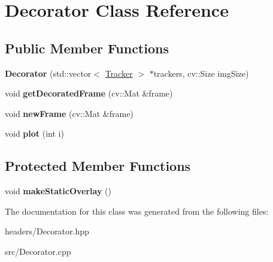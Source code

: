 \hypertarget{classDecorator}{\section{Decorator Class Reference}
\label{classDecorator}
}
\subsection*{Public Member Functions}
\begin{DoxyCompactItemize}
\item 
\hypertarget{classDecorator_a2c55e2aed9fe25a5be7fe5f2a8705d66}{{\bfseries Decorator} (std\-::vector$<$ \hyperlink{classTracker}{Tracker} $>$ $\ast$trackers, cv\-::\-Size img\-Size)}\label{classDecorator_a2c55e2aed9fe25a5be7fe5f2a8705d66}

\item 
\hypertarget{classDecorator_a4da99b258d95fe21772d534e915a4765}{void {\bfseries get\-Decorated\-Frame} (cv\-::\-Mat \&frame)}\label{classDecorator_a4da99b258d95fe21772d534e915a4765}

\item 
\hypertarget{classDecorator_a162529f4b2bd01f0023910b839f80b6e}{void {\bfseries new\-Frame} (cv\-::\-Mat \&frame)}\label{classDecorator_a162529f4b2bd01f0023910b839f80b6e}

\item 
\hypertarget{classDecorator_a2184982851eaca7055c9bf46d5c5a7c5}{void {\bfseries plot} (int i)}\label{classDecorator_a2184982851eaca7055c9bf46d5c5a7c5}

\end{DoxyCompactItemize}
\subsection*{Protected Member Functions}
\begin{DoxyCompactItemize}
\item 
\hypertarget{classDecorator_a5219da97e4c259f8fa36d55b11d245de}{void {\bfseries make\-Static\-Overlay} ()}\label{classDecorator_a5219da97e4c259f8fa36d55b11d245de}

\end{DoxyCompactItemize}


The documentation for this class was generated from the following files\-:\begin{DoxyCompactItemize}
\item 
headers/Decorator.\-hpp\item 
src/Decorator.\-cpp\end{DoxyCompactItemize}
